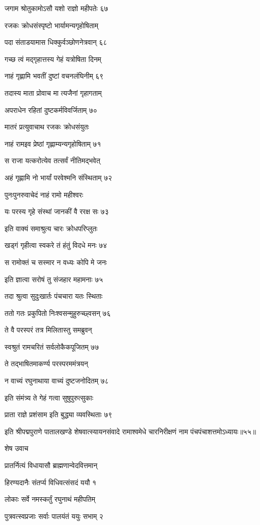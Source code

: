 जगाम श्रोतुकामोऽसौ यशो राज्ञो महीपतेः ६७

रजकः क्रोधसंस्पृष्टो भार्यामन्यगृहोषिताम्

पदा संताडयामास धिक्कुर्वञ्छोणनेत्रवान् ६८

गच्छ त्वं मद्गृहात्तस्य गेहं यत्रोषिता दिनम्

नाहं गृह्णामि भवतीं दुष्टां वचनलंघिनीम् ६९

तदास्य माता प्रोवाच मा त्यजैनां गृहागताम्

अपराधेन रहितां दुष्टकर्मविवर्जिताम् ७०

मातरं प्रत्युवाचाथ रजकः क्रोधसंयुतः

नाहं रामइव प्रेष्ठां गृह्णाम्यन्यगृहोषिताम् ७१

स राजा यत्करोत्येव तत्सर्वं नीतिमद्भवेत्

अहं गृह्णामि नो भार्यां परवेश्मनि संस्थिताम् ७२

पुनःपुनरुवाचेदं नाहं रामो महीश्वरः

यः परस्य गृहे संस्थां जानकीं वै ररक्ष सः ७३

इति वाक्यं समाश्रुत्य चारः क्रोधपरिप्लुतः

खड्गं गृहीत्वा स्वकरे तं हंतुं विदधे मनः ७४

स रामोक्तं च सस्मार न वध्यः कोपि मे जनः

इति ज्ञात्वा सरोषं तु संजहार महामनाः ७५

तदा श्रुत्वा सुदुःखार्तः पंचचारा यतः स्थिताः

ततो गतः प्रकुपितो निःश्वसन्मुहुरुच्छ्वसन् ७६

ते वै परस्परं तत्र मिलितास्तु समब्रुवन्

स्वश्रुतं रामचरितं सर्वलोकैकपूजितम् ७७

ते तद्भाषितमाकर्ण्य परस्परममंत्रयन्

न वाच्यं रघुनाथाया वाच्यं दुष्टजनोदितम् ७८

इति संमंत्र्य ते गेहं गत्वा सुषुपुरुत्सुकाः

प्राता राज्ञे प्रशंसाम इति बुद्ध्या व्यवस्थिताः ७९

इति श्रीपद्मपुराणे पातालखण्डे शेषवात्स्यायनसंवादे रामाश्वमेधे चारनिरीक्षणं नाम पंचपंचाशत्तमोऽध्यायः॥५५॥


शेष उवाच

प्रातर्नित्यं विधायासौ ब्राह्मणान्वेदवित्तमान्

हिरण्यदानैः संतर्प्य विधिवत्संसदं ययौ १

लोकाः सर्वे नमस्कर्तुं रघुनाथं महीपतिम्

पुत्रवत्स्वप्रजाः सर्वाः पालयंतं ययुः सभाम् २

